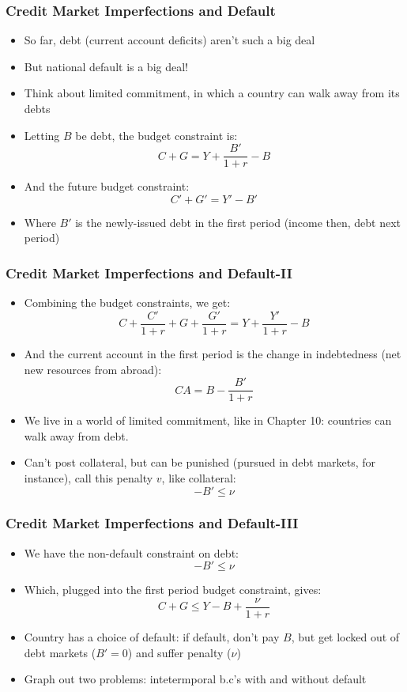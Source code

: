 \documentclass{beamer}
\begin{document}
\begin{frame}
\frametitle[alignment=center]{Credit Market Imperfections and Default}
\begin{itemize}
\item So far, debt (current account deficits) aren't such a big deal
\bigskip
\item But national default is a big deal!
\bigskip
\item Think about limited commitment, in which a country can walk away from its debts
\bigskip
\item Letting $B$ be debt, the budget constraint is:
$$C+G=Y+\frac{B'}{1+r}-B$$
\item And the future budget constraint:
$$C'+G'=Y'-B'$$
\item Where $B'$ is the newly-issued debt in the first period (income then, debt next period)
\end{itemize}
\end{frame}


\begin{frame}
\frametitle[alignment=center]{Credit Market Imperfections and Default-II}
\begin{itemize}
\item Combining the budget constraints, we get:
$$C+\frac{C'}{1+r}+G+\frac{G'}{1+r}=Y+\frac{Y'}{1+r}-B$$
\item And the current account in the first period is the change in indebtedness (net new resources from abroad):
$$CA=B-\frac{B'}{1+r}$$
\bigskip
\item We live in a world of limited commitment, like in Chapter 10:  countries can walk away from debt.
\bigskip
\item Can't post collateral, but can be punished (pursued in debt markets, for instance), call this penalty $v$, like collateral:
$$-B'\leq \nu$$
\end{itemize}
\end{frame}

\begin{frame}
\frametitle[alignment=center]{Credit Market Imperfections and Default-III}
\begin{itemize}
\item We have the non-default constraint on debt:
$$-B'\leq \nu$$
\item Which, plugged into the first period budget constraint, gives:
$$C+G\leq Y-B+\frac{\nu}{1+r}$$
\item Country has a choice of default:  if default, don't pay $B$, but get locked out of debt markets ($B'=0$) and suffer penalty ($\nu$)
\bigskip
\item Graph out two problems: intetermporal b.c's with and without default
\end{itemize}
\end{frame}
\end{document}
